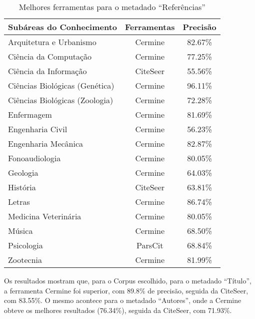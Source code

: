 \begin{table}[h!]
    \caption{Melhores ferramentas para o metadado ``Referências''}
    \begin{center}
        \begin{tabular}{|l|c|c|}
            \hline 
            \textbf{Subáreas do Conhecimento} & \textbf{Ferramentas} & \textbf{Precisão} \\ 
            \hline 
            Arquitetura e Urbanismo & Cermine & 82.67\% \\ \hline
            Ciência da Computação & Cermine & 77.25\% \\ \hline
            Ciência da Informação & CiteSeer & 55.56\% \\ \hline
            Ciências Biológicas (Genética) & Cermine & 96.11\% \\ \hline
            Ciências Biológicas (Zoologia) & Cermine & 72.28\% \\ \hline
            Enfermagem & Cermine & 81.69\% \\ \hline
            Engenharia Civil & Cermine & 56.23\% \\ \hline
            Engenharia Mecânica & Cermine & 82.87\% \\ \hline
            Fonoaudiologia & Cermine & 80.05\% \\ \hline
            Geologia & Cermine & 64.03\% \\ \hline
            História & CiteSeer & 63.81\% \\ \hline
            Letras & Cermine & 86.74\% \\ \hline
            Medicina Veterinária & Cermine & 80.05\% \\ \hline
            Música & Cermine & 68.50\% \\ \hline
            Psicologia & ParsCit & 68.84\% \\ \hline
            Zootecnia & Cermine & 81.99\% \\ \hline
        \end{tabular}
    \end{center}
    \label{tab:areas-references-tools}
\end{table}

Os resultados mostram que, para o Corpus escolhido, para o metadado ``Título'', a ferramenta Cermine foi superior, com 89.8\% de precisão, seguida da CiteSeer, com 83.55\%. O mesmo acontece para o metadado ``Autores'', onde a Cermine obteve os melhores resultados (76.34\%), seguida da CiteSeer, com 71.93\%.

